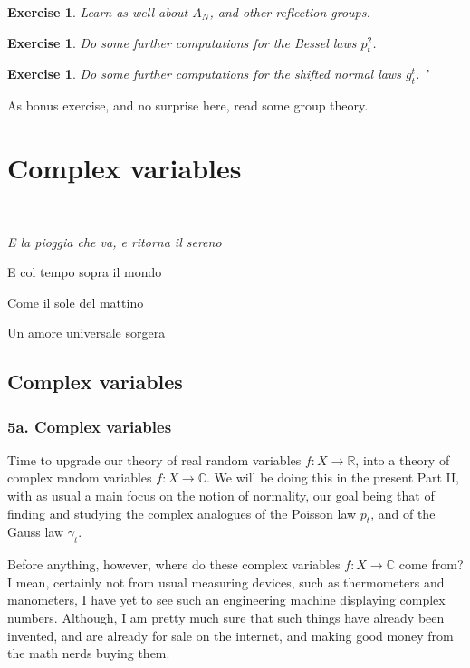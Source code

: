 \documentclass[12pt]{amsbook}
\newtheorem{exercise}[theorem]{Exercise}
\begin{document}
\begin{exercise}
Learn as well about $A_N$, and other reflection groups.
\end{exercise}

\begin{exercise}
Do some further computations for the Bessel laws $p^2_t$.
\end{exercise}

\begin{exercise}
Do some further computations for the shifted normal laws $g_t^t$.
'\end{exercise}

As bonus exercise, and no surprise here, read some group theory.

\part{Complex variables}

\ \vskip50mm

\begin{center}
{\em E la pioggia che va, e ritorna il sereno

E col tempo sopra il mondo

Come il sole del mattino

Un amore universale sorgera}
\end{center}

\chapter{Complex variables}

\section*{5a. Complex variables}

Time to upgrade our theory of real random variables $f:X\to\mathbb R$, into a theory of complex random variables $f:X\to\mathbb C$. We will be doing this in the present Part II, with as usual a main focus on the notion of normality, our goal being that of finding and studying the complex analogues of the Poisson law $p_t$, and of the Gauss law $\gamma_t$.

\bigskip

Before anything, however, where do these complex variables $f:X\to\mathbb C$ come from? I mean, certainly not from usual measuring devices, such as thermometers and manometers, I have yet to see such an engineering machine displaying complex numbers. Although, I am pretty much sure that such things have already been invented, and are already for sale on the internet, and making good money from the math nerds buying them.
\end{document}
